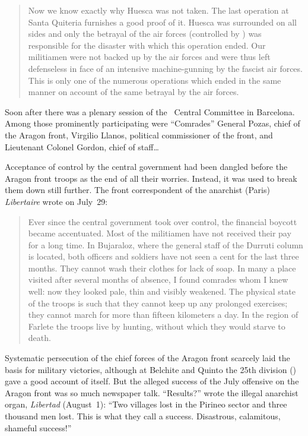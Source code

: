 \begin{quotation}
  Now we know exactly why Huesca was not taken. The last operation at Santa Quiteria furnishes a good proof of it. Hues\-ca was surrounded on all sides and only the betrayal of the air forces (controlled by \PSUC) was responsible for the disaster with which this operation ended. Our militiamen were not backed up by the air forces and were thus left defenseless in face of an intensive machine-gunning by the fascist air forces. This is only one of the numerous operations which ended in the same manner on account of the same betrayal by the air forces.
\end{quotation}

\indexPSUC\indexSPozas
Soon after there was a plenary session of the \PSUC\ Central Committee in Barcelona. Among those prominently participating were ``Comrades'' General Pozas, chief of the Aragon front, Virgilio Llanos, political commissioner of the front, and Lieutenant Colonel Gordon, chief of staff\dots

Acceptance of control by the central government had been dangled before the Aragon front troops as the end of all their worries. Instead, it was used to break them down still further. The front correspondent of the anarchist (Paris) \emph{Libertaire} wrote on July~29:

\begin{quotation}
  Ever since the central government took over control, the financial boycott became accentuated. Most of the militiamen have not received their pay for a long time. In Bujaraloz, where the general staff of the Durruti column is located, both officers and soldiers have not seen a cent for the last three months. They cannot wash their clothes for lack of soap. In many a place visited after several months of absence, I found comrades whom I knew well: now they looked pale, thin and visibly weakened. The physical state of the troops is such that they cannot keep up any prolonged exercises; they cannot march for more than fifteen kilometers a day. In the region of Farlete the troops live by hunting, without which they would starve to death.
\end{quotation}

\indexLibertad{}
Systematic persecution of the chief forces of the Aragon front scarcely laid the basis for military victories, although at Belchite and Quinto the 25th division (\CNT) gave a good account of itself. But the alleged success of the July offensive on the Aragon front was so much newspaper talk. ``Results?'' wrote the illegal anarchist organ, \emph{Libertad} (August~1): ``Two villages lost in the Pirineo sector and three thousand men lost. This is what they call a success. Disastrous, calamitous, shameful success!''

